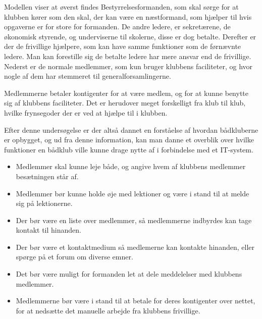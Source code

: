Modellen viser at øverst findes Bestyrrelsesformanden, som skal sørge for at klubben kører som den skal, der kan være en næstformand, som hjælper til hvis opgaverne er for store for formanden. De andre ledere, er sekretærene, de økonomisk styrende, og underviserne til skolerne, disse er dog betalte. Derefter er der de frivillige hjælpere, som kan have samme funktioner som de førnævnte ledere. Man kan forestille sig de betalte ledere har mere ansvar end de frivillige. Nederst er de normale medlemmer, som kun bruger klubbens faciliteter, og hvor nogle af dem har stemmeret til generalforsamlingerne.

Medlemmerne betaler kontigenter for at være medlem, og for at kunne benytte sig af klubbens faciliteter. Det er herudover meget forskelligt fra klub til klub, hvilke frynsegoder der er ved at hjælpe til i klubben.

Efter denne undersøgelse er der altså dannet en forståelse af hvordan bådkluberne er opbygget, og ud fra denne information, kan man danne et overblik over hvilke funktioner en bådklub ville kunne drage nytte af i forbindelse med et IT-system.


\begin{itemize}
	\item Medlemmer skal kunne leje både, og angive hvem af klubbens medlemmer besætningen står af.
	\item Medlemmer bør kunne holde øje med lektioner og være i stand til at melde sig på lektionerne.
	\item Der bør være en liste over medlemmer, så medlemmerne indbyrdes kan tage kontakt til hinanden.
	\item Der bør være et kontaktmedium så medlemerne kan kontakte hinanden, eller spørge på et forum om diverse emner.
	\item Det bør være muligt for formanden let at dele meddelelser med klubbens medlemmer. 
	\item Medlemmerne bør være i stand til at betale for deres kontigenter over nettet, for at nedsætte det manuelle arbejde fra klubbens frivillige.
\end{itemize}
\cbend
